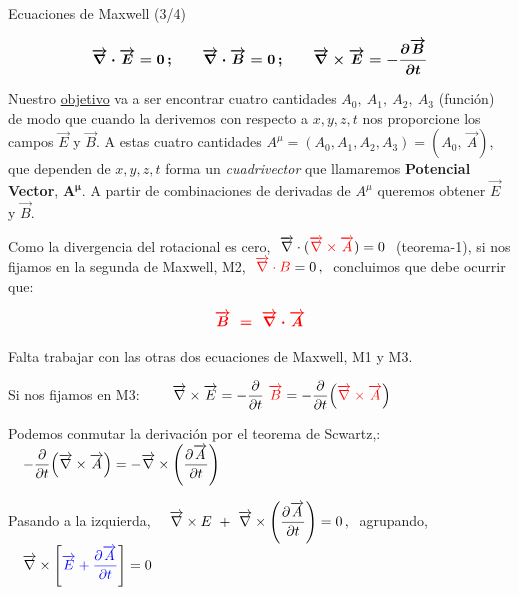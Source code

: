 \begin{myblock}{Ecuaciones de Maxwell (3/4)}
\begin{Large}
\begin{equation} \boldsymbol{
\overrightarrow \nabla \cdot \overrightarrow E = 0\, ; \quad  \quad \overrightarrow \nabla \cdot \overrightarrow B = 0\, ; \quad  \quad \overrightarrow \nabla \times \overrightarrow E = - \pdv{\overrightarrow B}{t} }
\end{equation}
\end{Large}
\end{myblock}

\vspace{5mm}
\normalsize{Nuestro} \underline{objetivo} va a ser encontrar cuatro cantidades $A_0,\ A_1,\ A_2, \ A_3$ (función) de modo que cuando la derivemos con respecto a $x,y,z,t$ nos proporcione los campos $\overrightarrow E$ y $\overrightarrow B$. A estas cuatro cantidades $A^\mu=(A_0, A_1, A_2, A_3)=(A_0,\  \overrightarrow A)$, que dependen de $x,y,z,t$ forma un \emph{cuadrivector} que llamaremos \textbf{Potencial Vector}, $\boldsymbol{A^\mu}$. A partir de combinaciones de derivadas de $A^\mu$ queremos obtener $\overrightarrow E$ y $\overrightarrow B$.

\vspace{5mm} Como la divergencia del rotacional es cero, $\ \overrightarrow \nabla \cdot (\textcolor{red}{\overrightarrow \nabla \times \overrightarrow A})=0\ $ (teorema-1), si nos fijamos en la segunda de Maxwell, M2, $\ \textcolor{red}{\overrightarrow \nabla \cdot B} =0 \, , \  $ concluimos que debe ocurrir que:

\begin{equation}
\textcolor{red}{\boldsymbol{ \overrightarrow B \ = \ \overrightarrow \nabla \cdot \overrightarrow A }}	
\end{equation}
 
 Falta trabajar con las otras dos ecuaciones de Maxwell, M1 y M3.
 
 Si nos fijamos en M3: $ \qquad \overrightarrow \nabla \times \overrightarrow E = \displaystyle -\pdv{t} \ \textcolor{red}{\overrightarrow B} = -\pdv{t} ( \textcolor{red}{\overrightarrow \nabla \times \overrightarrow A })$
 
 Podemos conmutar la derivación por el teorema de Scwartz,: $\quad \displaystyle - \pdv{t} ( \overrightarrow \nabla \times \overrightarrow A ) = - \overrightarrow \nabla \times \left( \pdv{\overrightarrow A}{t}  \right)$
 
 Pasando a la izquierda, $\quad \displaystyle \overrightarrow \nabla \times E \ + \  \overrightarrow \nabla  \times \left( \pdv{\overrightarrow A}{t}  \right) = 0 \, , \ $ agrupando, $\quad \displaystyle \overrightarrow \nabla \times \left[ \textcolor{blue}{\overrightarrow E + \pdv{\overrightarrow A}{t}} \right]=0$
 
